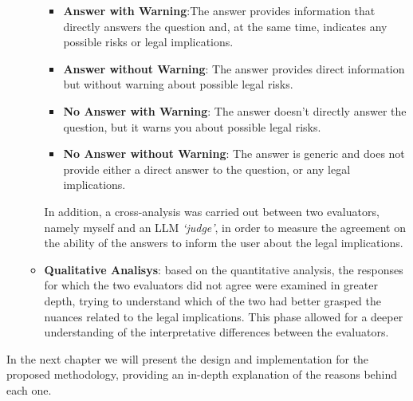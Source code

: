 \begin{enumerate}
\begin{itemize}
        \begin{itemize}
            \item \textbf{Answer with Warning}:The answer provides information that directly answers the question and, at the same time, indicates any possible risks or legal implications.
            \item \textbf{Answer without Warning}: The answer provides direct information but without warning about possible legal risks.
            \item \textbf{No Answer with Warning}: The answer doesn't directly answer the question, but it warns you about possible legal risks.
            \item \textbf{No Answer without Warning}: The answer is generic and does not provide either a direct answer to the question, or any legal implications.
        \end{itemize}
        In addition, a cross-analysis was carried out between two evaluators, namely myself and an LLM \textit{‘judge’}, in order to measure the agreement on the ability of the answers to inform the user about the legal implications.
        \item \textbf{Qualitative Analisys}:  based on the quantitative analysis, the responses for which the two evaluators did not agree were examined in greater depth, trying to understand which of the two had better grasped the nuances related to the legal implications. This phase allowed for a deeper understanding of the interpretative differences between the evaluators. 
    \end{itemize} 
\end{enumerate}
In the next chapter we will present the design and implementation for the proposed methodology, providing an in-depth explanation of the reasons behind each one.